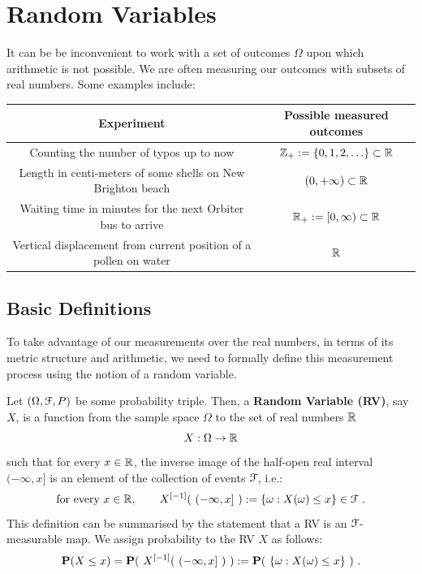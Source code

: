 \chapter{Random Variables}\label{S:RandomVariable}
It can be be inconvenient to work with a set of outcomes $\Omega$ upon which arithmetic is not possible.  We are often measuring our outcomes with subsets of real numbers.  Some examples include:

\begin{table}[ht]
\begin{tabular}{c c} \hline
Experiment & Possible measured outcomes\\ \hline
Counting the number of typos up to now & $\mathbb{Z}_+:=\{0,1,2,\ldots\} \subset \mathbb{R}$ \\
Length in centi-meters of some shells on New Brighton beach & $(0,+\infty) \subset \mathbb{R}$ \\
Waiting time in minutes for the next Orbiter bus to arrive & $\mathbb{R}_+:=[0,\infty) \subset \mathbb{R}$\\
Vertical displacement from current position of a pollen on water & $\mathbb{R}$ \\ \hline
\end{tabular}
\end{table}

\section{Basic Definitions}\label{S:RVBasicDefs}

To take advantage of our measurements over the real numbers, in terms of its  metric structure and arithmetic, we need to formally define this measurement process using the notion of a random variable.
\begin{definition}\label{D:RV}
Let $(\Omega, \mathcal{F},P)$ be some probability triple.  Then, a {\bf Random Variable (RV)}, say $X$, is a function from the sample space $\Omega$ to the set of real numbers $\mathbb{R}$ 
\[
X : \Omega \rightarrow \mathbb{R}
\]
such that for every $x \in \mathbb{R}$, the inverse image of the half-open real interval $(-\infty,x]$ is an element of the collection of events $\mathcal{F}$, i.e.:
\[
\text{for every $x$} \in \Rz, \qquad X^{[-1]}(\ (-\infty,x] \ ) := \{\omega: X(\omega) \leq x\} \in \C{F} \ .
\]
{\scriptsize This definition can be summarised by the statement that a RV is an  $\mathcal{F}$-measurable map.}
We assign probability to the RV $X$ as follows:
\begin{equation}\label{E:ProbOfRV}
\mathbf{P}(X \leq x)  = \mathbf{P}(\ X^{[-1]}(\ (-\infty,x] \ ) \ ) := \mathbf{P}( \ \{\omega: X(\omega) \leq x\} \ ) \ .
\end{equation}
\end{definition}

